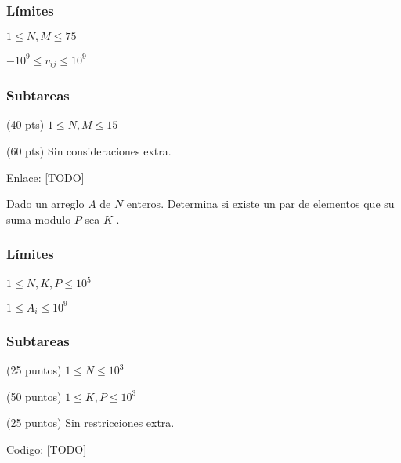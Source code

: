 \subsubsection*{Límites}

\begin{plimits}
	\item \(1\leq N, M\leq 75 \)
	\item \(-10^9\leq v_{ij}\leq 10^9 \)
\end{plimits}

\subsubsection*{Subtareas}

\begin{plimits}
	\item (40 pts) \(1\leq N, M\leq 15 \)
	\item (60 pts) Sin consideraciones extra.
\end{plimits}

Enlace: [TODO]

\problembreak

\problemtitle Dado un arreglo \(A\) de \(N\) enteros. Determina si existe un par de elementos que su suma modulo \(P\) sea \(K\) .

\subsubsection*{Límites}
\begin{plimits}
	\item \(1\leq N,K,P\leq 10^5 \)
	\item \(1\leq A_i\leq 10^9 \)
\end{plimits}

\subsubsection*{Subtareas}
\begin{plimits}
	\item (25 puntos) \(1\leq N\leq 10^3 \)
	\item (50 puntos) \(1\leq K, P\leq 10^3 \)
	\item (25 puntos) Sin restricciones extra.
\end{plimits}

Codigo: [TODO]